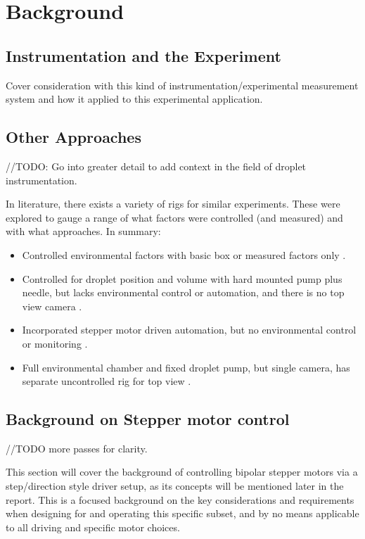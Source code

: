 \chapter{Background}\label{C:back}

\section{Instrumentation and the Experiment}
Cover consideration with this kind of instrumentation/experimental measurement system and how it applied to this experimental application.

\section{Other Approaches}
//TODO: Go into greater detail to add context in the field of droplet instrumentation.

In literature, there exists a variety of rigs for similar experiments. These were explored to gauge a range of what factors were controlled (and measured) and with what approaches. In summary:
\begin{itemize}
    \item Controlled environmental factors with basic box \cite{step_book} or measured factors only \cite{measure_only}.
    \item Controlled for droplet position and volume with hard mounted pump plus needle, but lacks environmental control or automation, and there is no top view camera \cite{non_newt} \cite{fixed_pump}.
    \item Incorporated stepper motor driven automation, but no environmental control or monitoring \cite{motors}.
    \item Full environmental chamber and fixed droplet pump, but single camera, has separate uncontrolled rig for top view \cite{duel_rig}.
\end{itemize}

\newpage
\section{Background on Stepper motor control}
//TODO more passes for clarity.

This section will cover the background of controlling bipolar stepper motors via a step/direction style driver setup, as its concepts will be mentioned later in the report. This is a focused background on the key considerations and requirements when designing for and operating this specific subset, and by no means applicable to all driving and specific motor choices.

